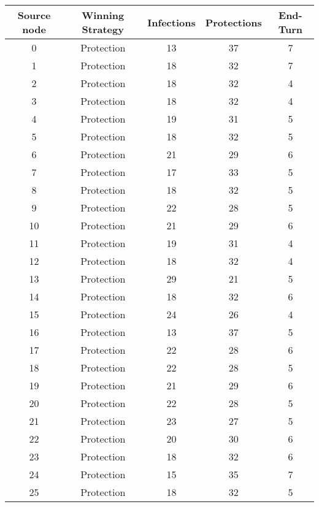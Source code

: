 \documentclass[results.tex]{subfiles}
\begin{document}
\begin{center}
  \begin{tabular}{| c || c | c | c | c |}
    \hline
    {\bfseries Source node} & {\bfseries Winning Strategy} & {\bfseries Infections} & {\bfseries Protections} & {\bfseries End-Turn} \\  %
    \hline\hline
    0 & Protection & 13 & 37 & 7 \\ 
    \hline
    1 & Protection & 18 & 32 & 7 \\ 
    \hline
    2 & Protection & 18 & 32 & 4 \\ 
    \hline
    3 & Protection & 18 & 32 & 4 \\ 
    \hline
    4 & Protection & 19 & 31 & 5 \\ 
    \hline
    5 & Protection & 18 & 32 & 5 \\ 
    \hline
    6 & Protection & 21 & 29 & 6 \\ 
    \hline
    7 & Protection & 17 & 33 & 5 \\ 
    \hline
    8 & Protection & 18 & 32 & 5 \\ 
    \hline
    9 & Protection & 22 & 28 & 5 \\ 
    \hline
    10 & Protection & 21 & 29 & 6 \\ 
    \hline
    11 & Protection & 19 & 31 & 4 \\ 
    \hline
    12 & Protection & 18 & 32 & 4 \\ 
    \hline
    13 & Protection & 29 & 21 & 5 \\ 
    \hline
    14 & Protection & 18 & 32 & 6 \\ 
    \hline
    15 & Protection & 24 & 26 & 4 \\ 
    \hline
    16 & Protection & 13 & 37 & 5 \\ 
    \hline
    17 & Protection & 22 & 28 & 6 \\ 
    \hline
    18 & Protection & 22 & 28 & 5 \\ 
    \hline
    19 & Protection & 21 & 29 & 6 \\ 
    \hline
    20 & Protection & 22 & 28 & 5 \\ 
    \hline
    21 & Protection & 23 & 27 & 5 \\ 
    \hline
    22 & Protection & 20 & 30 & 6 \\ 
    \hline
    23 & Protection & 18 & 32 & 6 \\ 
    \hline
    24 & Protection & 15 & 35 & 7 \\ 
    \hline
    25 & Protection & 18 & 32 & 5 \\ 

\end{tabular}
\end{center}
\end{document}
